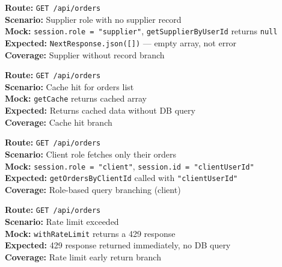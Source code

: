 \documentclass[12pt,a4paper]{report}
\newcommand{\pone}{\textbf{\color{p1red}P1}}
\newcommand{\ptwo}{\textbf{\color{p2orange}P2}}
\begin{document}
\begin{tcolorbox}[testbox, title={ORD-013 \hfill \ptwo}]
\textbf{Route:} \texttt{GET /api/orders} \\
\textbf{Scenario:} Supplier role with no supplier record \\
\textbf{Mock:} \texttt{session.role = "supplier"}, \texttt{getSupplierByUserId} returns \texttt{null} \\
\textbf{Expected:} \texttt{NextResponse.json([])} --- empty array, not error \\
\textbf{Coverage:} Supplier without record branch
\end{tcolorbox}

\begin{tcolorbox}[testbox, title={ORD-014 \hfill \ptwo}]
\textbf{Route:} \texttt{GET /api/orders} \\
\textbf{Scenario:} Cache hit for orders list \\
\textbf{Mock:} \texttt{getCache} returns cached array \\
\textbf{Expected:} Returns cached data without DB query \\
\textbf{Coverage:} Cache hit branch
\end{tcolorbox}

\begin{tcolorbox}[testbox, title={ORD-015 \hfill \pone}]
\textbf{Route:} \texttt{GET /api/orders} \\
\textbf{Scenario:} Client role fetches only their orders \\
\textbf{Mock:} \texttt{session.role = "client"}, \texttt{session.id = "clientUserId"} \\
\textbf{Expected:} \texttt{getOrdersByClientId} called with \texttt{"clientUserId"} \\
\textbf{Coverage:} Role-based query branching (client)
\end{tcolorbox}

\begin{tcolorbox}[testbox, title={ORD-016 \hfill \ptwo}]
\textbf{Route:} \texttt{GET /api/orders} \\
\textbf{Scenario:} Rate limit exceeded \\
\textbf{Mock:} \texttt{withRateLimit} returns a 429 response \\
\textbf{Expected:} 429 response returned immediately, no DB query \\
\textbf{Coverage:} Rate limit early return branch
\end{tcolorbox}
\end{document}
